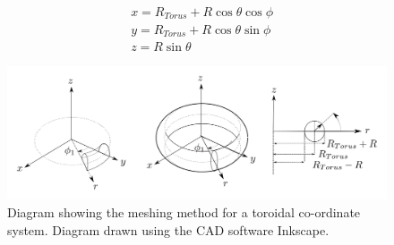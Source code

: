 \documentclass[12pt,a4paper]{article}
\begin{document}
\begin{equation}
\begin{aligned}
& x = R_{Torus} + R\cos{\theta}\cos{\phi} \\
& y = R_{Torus} + R\cos{\theta}\sin{\phi} \\
& z =  R\sin{\theta} 
\end{aligned}
\end{equation}

\begin{figure}[h!]
\centering
\includegraphics[scale=0.35]{Images//Coords/torus_coords.png}
\caption[width=\columnwidth]{Diagram showing the meshing method for a toroidal co-ordinate system. Diagram drawn using the CAD software Inkscape.}
\label{tormeshin}
\end{figure}
\end{document}
